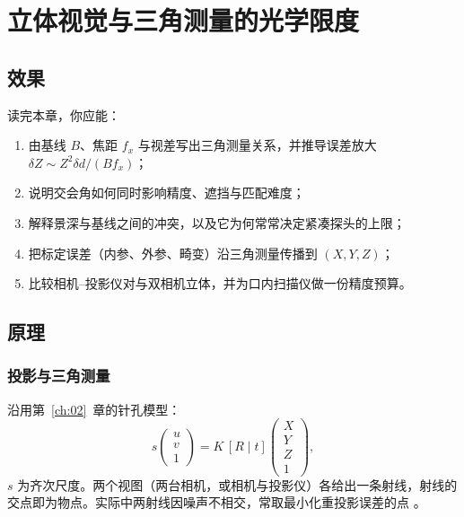 \chapter{立体视觉与三角测量的光学限度}
\label{ch:08}

\section{效果}
\label{sec:ch07-effect}

读完本章，你应能：
\begin{enumerate}
  \item 由基线 $B$、焦距 $f_x$ 与视差写出三角测量关系，并推导误差放大 $\delta Z\sim Z^2\delta d/(Bf_x)$；
  \item 说明交会角如何同时影响精度、遮挡与匹配难度；
  \item 解释景深与基线之间的冲突，以及它为何常常决定紧凑探头的上限；
  \item 把标定误差（内参、外参、畸变）沿三角测量传播到 $(X,Y,Z)$；
  \item 比较相机–投影仪对与双相机立体，并为口内扫描仪做一份精度预算。
\end{enumerate}

\section{原理}
\label{sec:ch07-principle}

\subsection{投影与三角测量}

沿用第~\ref{ch:02}~章的针孔模型：
\begin{equation}
  s\begin{pmatrix}u\\v\\1\end{pmatrix}=K\,[R\mid t]\begin{pmatrix}X\\Y\\Z\\1\end{pmatrix},
  \label{eq:ch08-proj}
\end{equation}
$s$ 为齐次尺度。两个视图（两台相机，或相机与投影仪）各给出一条射线，射线的交点即为物点。实际中两射线因噪声不相交，常取最小化重投影误差的点 \citep{HartleyZisserman2004}。


